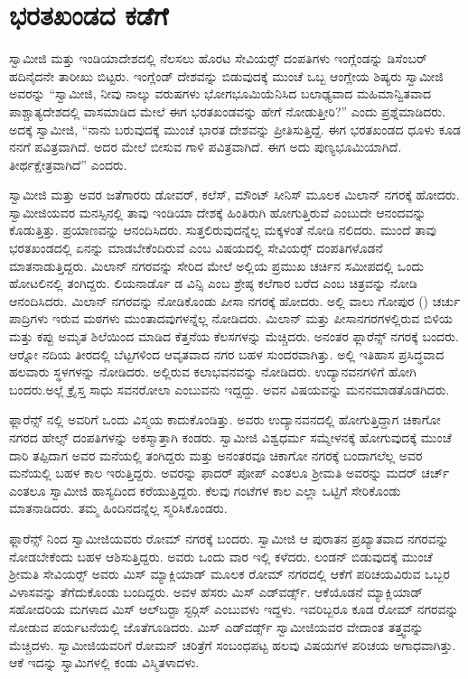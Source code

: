 
\chapter{ಭರತಖಂಡದ ಕಡೆಗೆ }

 ಸ್ವಾಮೀಜಿ ಮತ್ತು ಇಂಡಿಯಾದೇಶದಲ್ಲಿ ನೆಲಸಲು ಹೊರಟ ಸೇವಿಯರ್ಸ್‍‍ ದಂಪತಿಗಳು ಇಂಗ್ಲೆಂಡನ್ನು ಡಿಸೆಂಬರ್ ಹದಿನೈದನೇ ತಾರೀಖು ಬಿಟ್ಟರು. ಇಂಗ್ಲೆಂಡ್ ದೇಶವನ್ನು ಬಿಡುವುದಕ್ಕೆ ಮುಂಚೆ ಒಬ್ಬ ಆಂಗ್ಲೇಯ ಶಿಷ್ಯರು ಸ್ವಾಮೀಜಿ ಅವರನ್ನು “ಸ್ವಾಮೀಜಿ, ನೀವು ನಾಲ್ಕು ವರುಷಗಳು ಭೋಗಭೂಮಿಯೆನಿಸಿದ ಬಲಾಢ್ಯವಾದ ಮಹಿಮಾನ್ವಿತವಾದ ಪಾಶ್ಚಾತ್ಯದೇಶದಲ್ಲಿ ವಾಸಮಾಡಿದ ಮೇಲೆ ಈಗ ಭರತಖಂಡವನ್ನು ಹೇಗೆ ನೋಡುತ್ತೀರಿ?” ಎಂದು ಪ್ರಶ್ನೆಮಾಡಿದರು. ಅದಕ್ಕೆ ಸ್ವಾಮೀಜಿ, “ನಾನು ಬರುವುದಕ್ಕೆ ಮುಂಚೆ ಭಾರತ ದೇಶವನ್ನು ಪ್ರೀತಿಸುತ್ತಿದ್ದೆ. ಈಗ ಭರತಖಂಡದ ಧೂಳು ಕೂಡ ನನಗೆ ಪವಿತ್ರವಾಗಿದೆ. ಅದರ ಮೇಲೆ ಬೀಸುವ ಗಾಳಿ ಪವಿತ್ರವಾಗಿದೆ. ಈಗ ಅದು ಪುಣ್ಯಭೂಮಿಯಾಗಿದೆ. ತೀರ್ಥಕ್ಷೇತ್ರವಾಗಿದೆ” ಎಂದರು. 

 ಸ್ವಾಮೀಜಿ ಮತ್ತು ಅವರ ಜತೆಗಾರರು ಡೋವರ್, ಕಲೆಸ್, ಮೌಂಟ್ ಸೀನಿಸ್ ಮೂಲಕ ಮಿಲಾನ್ ನಗರಕ್ಕೆ ಹೋದರು. ಸ್ವಾಮೀಜಿಯವರ ಮನಸ್ಸಿನಲ್ಲಿ ತಾವು ಇಂಡಿಯಾ ದೇಶಕ್ಕೆ ಹಿಂತಿರುಗಿ ಹೋಗುತ್ತಿರುವೆ ಎಂಬುದೇ ಆನಂದವನ್ನು ಕೊಡುತ್ತಿತ್ತು. ಪ್ರಯಾಣವನ್ನು ಆನಂದಿಸಿದರು. ಸುತ್ತಲಿರುವುದನ್ನೆಲ್ಲ ಮಕ್ಕಳಂತೆ ನೋಡಿ ನಲಿದರು. ಮುಂದೆ ತಾವು ಭರತಖಂಡದಲ್ಲಿ ಏನನ್ನು ಮಾಡಬೇಕೆಂದಿರುವೆ ಎಂಬ ವಿಷಯದಲ್ಲಿ ಸೇವಿಯರ್ಸ್‍‍ ದಂಪತಿಗಳೊಡನೆ ಮಾತನಾಡುತ್ತಿದ್ದರು. ಮಿಲಾನ್ ನಗರವನ್ನು ಸೇರಿದ ಮೇಲೆ ಅಲ್ಲಿಯ ಪ್ರಮುಖ ಚರ್ಚಿನ ಸಮೀಪದಲ್ಲಿ ಒಂದು ಹೋಟಲಿನಲ್ಲಿ ತಂಗಿದ್ದರು. ಲಿಯನಾರ್ಡೊ ಡ ವಿನ್ಸಿ ಎಂಬ ಶ್ರೇಷ್ಠ ಕಲೆಗಾರ ಬರೆದ  ಎಂಬ ಚಿತ್ರವನ್ನು ನೋಡಿ ಆನಂದಿಸಿದರು. ಮಿಲಾನ್ ನಗರವನ್ನು ನೋಡಿಕೊಂಡು ಪೀಸಾ ನಗರಕ್ಕೆ ಹೋದರು. ಅಲ್ಲಿ ವಾಲು ಗೋಪುರ () ಚರ್ಚು ಪಾದ್ರಿಗಳು ಇರುವ ಮಠಗಳು ಮುಂತಾದವುಗಳನ್ನೆಲ್ಲ ನೋಡಿದರು. ಮಿಲಾನ್ ಮತ್ತು ಪೀಸಾನಗರಗಳಲ್ಲಿರುವ ಬಿಳಿಯ ಮತ್ತು ಕಪ್ಪು ಅಮೃತ ಶಿಲೆಯಿಂದ ಮಾಡಿದ ಕೆತ್ತನೆಯ ಕೆಲಸಗಳನ್ನು ಮೆಚ್ಚಿದರು. ಅನಂತರ ಫ್ಲಾರೆನ್ಸ್ ನಗರಕ್ಕೆ ಬಂದರು. ಆರ‍್ನೋ ನದಿಯ ತೀರದಲ್ಲಿ ಬೆಟ್ಟಗಳಿಂದ ಆವೃತವಾದ ನಗರ ಬಹಳ ಸುಂದರವಾಗಿತ್ತು. ಅಲ್ಲಿ ಇತಿಹಾಸ ಪ್ರಸಿದ್ಧವಾದ ಹಲವಾರು ಸ್ಥಳಗಳನ್ನು ನೋಡಿದರು. ಅಲ್ಲಿರುವ ಕಲಾಭವನವನ್ನು ನೋಡಿದರು. ಉದ್ಯಾನವನಗಳಿಗೆ ಹೋಗಿ ಬಂದರು.\break ಅಲ್ಲೆ ಕ್ರೈಸ್ತ ಸಾಧು ಸವನರೋಲಾ ಎಂಬುವನು ಇದ್ದದ್ದು. ಅವನ ವಿಷಯವನ್ನು ಮನನಮಾಡತೊಡಗಿದರು. 

 ಫ್ಲಾರೆನ್ಸ್ ನಲ್ಲಿ ಅವರಿಗೆ ಒಂದು ವಿಸ್ಮಯ ಕಾದುಕೊಂಡಿತ್ತು. ಅವರು ಉದ್ಯಾನವನದಲ್ಲಿ ಹೋಗುತ್ತಿದ್ದಾಗ ಚಿಕಾಗೋ ನಗರದ ಹೇಲ್ಸ್ ದಂಪತಿಗಳನ್ನು ಅಕಸ್ಮಾತ್ತಾಗಿ ಕಂಡರು. ಸ್ವಾಮೀಜಿ ವಿಶ್ವಧರ್ಮ ಸಮ್ಮೇಳನಕ್ಕೆ ಹೋಗುವುದಕ್ಕೆ ಮುಂಚೆ ದಾರಿ ತಪ್ಪಿದಾಗ ಅವರ ಮನೆಯಲ್ಲಿ ತಂಗಿದ್ದರು ಮತ್ತು ಅನಂತರವೂ ಚಿಕಾಗೋ ನಗರಕ್ಕೆ ಬಂದಾಗಲೆಲ್ಲ ಅವರ ಮನೆಯಲ್ಲಿ ಬಹಳ ಕಾಲ ಇರುತ್ತಿದ್ದರು. ಅವರನ್ನು ಫಾದರ್ ಪೋಪ್ ಎಂತಲೂ ಶ‍್ರೀಮತಿ ಅವರನ್ನು ಮದರ್ ಚರ್ಚ್ ಎಂತಲೂ ಸ್ವಾಮೀಜಿ ಹಾಸ್ಯದಿಂದ ಕರೆಯುತ್ತಿದ್ದರು. ಕೆಲವು ಗಂಟೆಗಳ ಕಾಲ ಎಲ್ಲಾ ಒಟ್ಟಿಗೆ ಸೇರಿಕೊಂಡು ಮಾತನಾಡಿದರು. ತಮ್ಮ ಹಿಂದಿನದನ್ನೆಲ್ಲ ಸ್ಮರಿಸಿಕೊಂಡರು. 

\vskip 3pt

 ಫ್ಲಾರೆನ್ಸ್ ನಿಂದ ಸ್ವಾಮೀಜಿಯವರು ರೋಮ್ ನಗರಕ್ಕೆ ಬಂದರು. ಸ್ವಾಮೀಜಿ ಆ ಪುರಾತನ ಪ್ರಖ್ಯಾತವಾದ ನಗರವನ್ನು ನೋಡಬೇಕೆಂದು ಬಹಳ ಆಶಿಸುತ್ತಿದ್ದರು. ಅವರು ಒಂದು ವಾರ ಇಲ್ಲಿ ಕಳೆದರು. ಲಂಡನ್ ಬಿಡುವುದಕ್ಕೆ ಮುಂಚೆ ಶ‍್ರೀಮತಿ ಸೇವಿಯರ್ಸ್‍‍ ಅವರು ಮಿಸ್ ಮ್ಯಾಕ್ಲಿಯಾಡ್ ಮೂಲಕ ರೋಮ್ ನಗರದಲ್ಲಿ ಆಕೆಗೆ ಪರಿಚಯವಿರುವ ಒಬ್ಬರ ವಿಳಾಸವನ್ನು ತೆಗೆದುಕೊಂಡು ಬಂದಿದ್ದರು. ಅವಳ ಹೆಸರು ಮಿಸ್ ಎಡ್‍ವರ್ಡ್ಸ್. ಆಕೆಯೊಡನೆ ಮ್ಯಾಕ್ಲಿಯಾಡ್ ಸಹೋದರಿಯ ಮಗಳಾದ ಮಿಸ್ ಆಲ್‍ಬರ‍್ಟಾ ಸ್ಟರ್‍ಗಿಸ್ ಎಂಬುವಳು ಇದ್ದಳು. ಇವರಿಬ್ಬರೂ ಕೂಡ ರೋಮ್ ನಗರವನ್ನು ನೋಡುವ ಪರ್ಯಟನೆಯಲ್ಲಿ ಜೊತೆಗೂಡಿದರು. ಮಿಸ್ ಎಡ್‍ವರ್ಡ್ಸ್ ಸ್ವಾಮೀಜಿಯವರ ವೇದಾಂತ ತತ್ತ್ವವನ್ನು ಮೆಚ್ಚಿದಳು. ಸ್ವಾಮೀಜಿಯವರಿಗೆ ರೋಮನ್ ಚರಿತ್ರೆಗೆ ಸಂಬಂಧಪಟ್ಟ ಹಲವು ವಿಷಯಗಳ ಪರಿಚಯ ಅಗಾಧವಾಗಿತ್ತು. ಆಕೆ ಇದನ್ನು ಸ್ವಾಮಿಗಳಲ್ಲಿ ಕಂಡು ವಿಸ್ಮಿತಳಾದಳು. 

